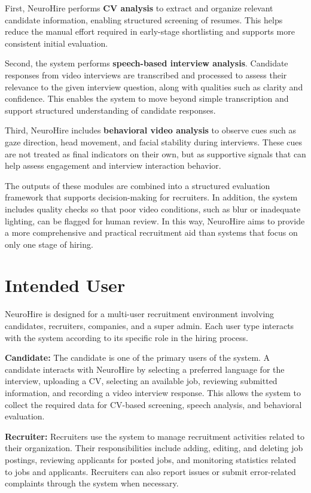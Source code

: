 First, NeuroHire performs \textbf{CV analysis} to extract and organize relevant candidate information, enabling structured screening of resumes. This helps reduce the manual effort required in early-stage shortlisting and supports more consistent initial evaluation.

Second, the system performs \textbf{speech-based interview analysis}. Candidate responses from video interviews are transcribed and processed to assess their relevance to the given interview question, along with qualities such as clarity and confidence. This enables the system to move beyond simple transcription and support structured understanding of candidate responses.

Third, NeuroHire includes \textbf{behavioral video analysis} to observe cues such as gaze direction, head movement, and facial stability during interviews. These cues are not treated as final indicators on their own, but as supportive signals that can help assess engagement and interview interaction behavior.

The outputs of these modules are combined into a structured evaluation framework that supports decision-making for recruiters. In addition, the system includes quality checks so that poor video conditions, such as blur or inadequate lighting, can be flagged for human review. In this way, NeuroHire aims to provide a more comprehensive and practical recruitment aid than systems that focus on only one stage of hiring.

\section{Intended User}
NeuroHire is designed for a multi-user recruitment environment involving candidates, recruiters, companies, and a super admin. Each user type interacts with the system according to its specific role in the hiring process.

\textbf{Candidate:}  
The candidate is one of the primary users of the system. A candidate interacts with NeuroHire by selecting a preferred language for the interview, uploading a CV, selecting an available job, reviewing submitted information, and recording a video interview response. This allows the system to collect the required data for CV-based screening, speech analysis, and behavioral evaluation.

\textbf{Recruiter:}  
Recruiters use the system to manage recruitment activities related to their organization. Their responsibilities include adding, editing, and deleting job postings, reviewing applicants for posted jobs, and monitoring statistics related to jobs and applicants. Recruiters can also report issues or submit error-related complaints through the system when necessary.


